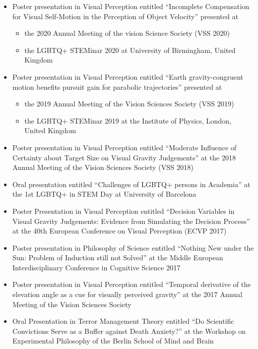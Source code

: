 \documentclass[]{article}
\providecommand{\tightlist}{%
  \setlength{\itemsep}{0pt}\setlength{\parskip}{0pt}}
\begin{document}
\begin{itemize}
\item
  Poster presentation in Visual Perception entitled ``Incomplete
  Compensation for Visual Self-Motion in the Perception of Object
  Velocity'' presented at

  \begin{itemize}
  \tightlist
  \item
    the 2020 Annual Meeting of the vision Science Society (VSS 2020)\\
  \item
    the LGBTQ+ STEMinar 2020 at University of Birmingham, United Kingdom
  \end{itemize}
\item
  Poster presentation in Visual Perception entitled ``Earth
  gravity-congruent motion benefits pursuit gain for parabolic
  trajectories'' presented at

  \begin{itemize}
  \tightlist
  \item
    the 2019 Annual Meeting of the Vision Sciences Society (VSS 2019)
  \item
    the LGBTQ+ STEMinar 2019 at the Institute of Physics, London, United
    Kingdom
  \end{itemize}
\item
  Poster presentation in Visual Perception entitled ``Moderate Influence
  of Certainty about Target Size on Visual Gravity Judgements'' at the
  2018 Annual Meeting of the Vision Sciences Society (VSS 2018)
\item
  Oral presentation entitled ``Challenges of LGBTQ+ persons in
  Academia'' at the 1st LGBTQ+ in STEM Day at University of Barcelona
\item
  Poster Presentation in Visual Perception entitled ``Decision Variables
  in Visual Gravity Judgements: Evidence from Simulating the Decision
  Process'' at the 40th European Conference on Visual Perception (ECVP
  2017)
\item
  Poster presentation in Philosophy of Science entitled ``Nothing New
  under the Sun: Problem of Induction still not Solved'' at the Middle
  European Interdisciplinary Conference in Cognitive Science 2017
\item
  Poster presentation in Visual Perception entitled ``Temporal
  derivative of the elevation angle as a cue for visually perceived
  gravity'' at the 2017 Annual Meeting of the Vision Sciences Society
\item
  Oral Presentation in Terror Management Theory entitled ``Do Scientific
  Convictions Serve as a Buffer against Death Anxiety?'' at the Workshop
  on Experimental Philosophy of the Berlin School of Mind and Brain
\end{itemize}
\end{document}
